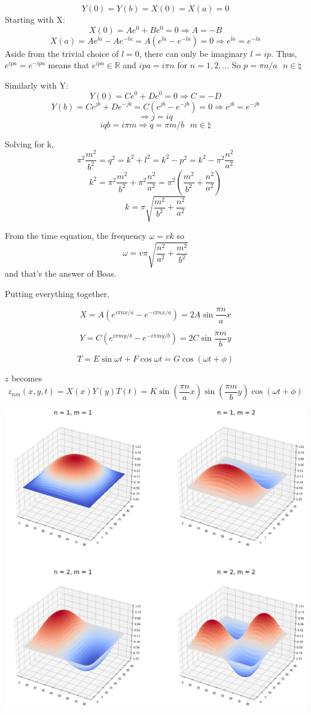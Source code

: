 \documentclass[answers]{exam}\newcommand{\repositoryInformationSetup}{     \usepackage[dvipsnames]{xcolor}     \usepackage[ angle=90, color=black, opacity=1, scale=2, ]{background}      \SetBgPosition{current page.west}      \SetBgVshift{-4.5mm}      \backgroundsetup{contents={{\color{green}\texttt{-{}-} differs from commit \texttt{f3526e2} in 0 files}}} } \newcommand{\commit}{{{\color{green}f3526e2}}}\usepackage{amsmath}
\newcommand{\Reals}{\mathbb{R}\xspace}
\begin{document}
\begin{questions}
\begin{solution}
		$$ Y(0) = Y(b) = X(0) = X(a) = 0$$
		Starting with X:
		$$ X(0) = Ae^{0}+Be^{0} =0 \Rightarrow A=-B$$
		$$ X(a) = Ae^{la}-Ae^{-la} = A (e^{la}-e^{-la}) = 0 \Rightarrow e^{la} = e^{-la}$$
		Aside from the trivial choice of $l=0$, there can only be imaginary $l = ip$. Thus, $e^{ipa} = e^{-ipa}$
		means that $e^{ipa} \in \Reals$ and $ipa = i\pi n \text{  for  } n = 1, 2, ...$
		So $ p = \pi n/a \text{  } n \in \natural$

		Similarly with Y:
		$$ Y(0) = Ce^{0}+De^{0} = 0 \Rightarrow C = -D$$
		$$ Y(b) = Ce^{jb}+De^{-jb} = C(e^{jb}-e^{-jb}) = 0 \Rightarrow e^{jb} = e^{-jb}$$
		$$ \Rightarrow j = iq$$
		$$ iqb = i\pi m \Rightarrow q = \pi m/b \text{  } m \in \natural$$

		Solving for k,
		$$ \pi^2 \frac{m^2}{b^2} = q^2 = k^2 + l^2 = k^2 - p^2 = k^2 - \pi ^2 \frac{n^2}{a^2} $$
		$$ k^2 = \pi^2 \frac{m^2}{b^2} + \pi ^2 \frac{n^2}{a^2} = \pi^2 \left(\frac{m^2}{b^2} + \frac{n^2}{a^2}\right)$$
		$$ k = \pi \sqrt{\frac{m^2}{b^2} +  \frac{n^2}{a^2}}$$

		From the time equation, the frequency $\omega = vk$ so $$\omega =  v\pi \sqrt{\frac{n^2}{a^2} + \frac{m^2}{b^2}}$$ and that's the answer of Boas.

		Putting everything together,

		$$ X = A (e^{i\pi n x/a}-e^{-i\pi n x/a}) = 2A \sin \frac{\pi n}{a} x $$

		$$ Y = C(e^{i\pi m y/b}-e^{-i\pi m y/b}) = 2C \sin \frac{\pi m}{b} y $$

		$$ T = E \sin \omega t + F\cos \omega t = G\cos(\omega t + \phi) $$

		$z$ becomes
		$$ z_{nm}(x,y,t) = X(x)Y(y)T(t) = K \sin \left( \frac{\pi n}{a} x \right) \sin \left( \frac{\pi m}{b} y\right)  \cos(\omega t + \phi) $$

		\includegraphics[scale=0.37]{hw12-q3.png}


\end{solution}
\end{questions}
\end{document}
